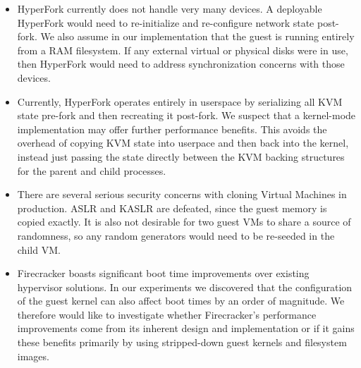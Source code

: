 \begin{itemize}
  \item HyperFork currently does not handle very many devices. A deployable HyperFork would need to re-initialize and re-configure network state post-fork. We also assume in our implementation that the guest is running entirely from a RAM filesystem. If any external virtual or physical disks were in use, then HyperFork would need to address synchronization concerns with those devices.
  \item Currently, HyperFork operates entirely in userspace by serializing all KVM state pre-fork and then recreating it post-fork. We suspect that a kernel-mode implementation may offer further performance benefits. This avoids the overhead of copying KVM state into userpace and then back into the kernel, instead just passing the state directly between the KVM backing structures for the parent and child processes.
  \item There are several serious security concerns with cloning Virtual Machines in production. ASLR and KASLR are defeated, since the guest memory is copied exactly. It is also not desirable for two guest VMs to share a source of randomness, so any random generators would need to be re-seeded in the child VM.
  \item Firecracker boasts significant boot time improvements over existing hypervisor solutions. In our experiments we discovered that the configuration of the guest kernel can also affect boot times by an order of magnitude. We therefore would like to investigate whether Firecracker's performance improvements come from its inherent design and implementation or if it gains these benefits primarily by using stripped-down guest kernels and filesystem images.
\end{itemize}
